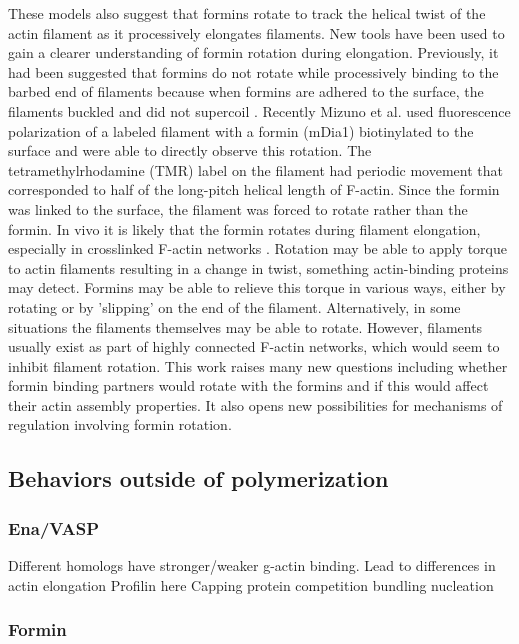 These models also suggest that formins rotate to track the helical twist of the actin filament as it processively elongates filaments. New tools have been used to gain a clearer understanding of formin rotation during elongation. Previously, it had been suggested that formins do not rotate while processively binding to the barbed end of filaments because when formins are adhered to the surface, the filaments buckled and did not supercoil \citep{kovar_insertional_2004}. Recently Mizuno et al. used fluorescence polarization of a labeled filament with a formin (mDia1) biotinylated to the surface and were able to directly observe this rotation. The tetramethylrhodamine (TMR) label on the filament had periodic movement that corresponded to half of the long-pitch helical length of F-actin. Since the formin was linked to the surface, the filament was forced to rotate rather than the formin. In vivo it is likely that the formin rotates during filament elongation, especially in crosslinked F-actin networks \citep{mizuno_rotational_2011}. Rotation may be able to apply torque to actin filaments resulting in a change in twist, something actin-binding proteins may detect. Formins may be able to relieve this torque in various ways, either by rotating or by 'slipping' on the end of the filament. Alternatively, in some situations the filaments themselves may be able to rotate. However, filaments usually exist as part of highly connected F-actin networks, which would seem to inhibit filament rotation. This work raises many new questions including whether formin binding partners would rotate with the formins and if this would affect their actin assembly properties. It also opens new possibilities for mechanisms of regulation involving formin rotation. 

\subsection{Behaviors outside of polymerization}\label{ena-formin-behaviors}

\subsubsection{Ena/VASP}
Different homologs have stronger/weaker g-actin binding. Lead to differences in actin elongation
Profilin here
Capping protein competition
bundling
nucleation

\subsubsection{Formin}

